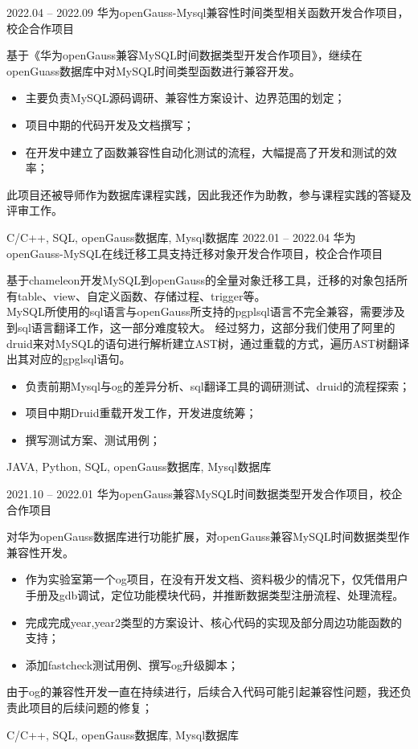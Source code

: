 \begin{experiences}
\emptySeparator	
 \experiencenew
    {2022.04 -- 2022.09} {华为openGauss-Mysql兼容性时间类型相关函数开发合作项目，校企合作项目}
    {
      基于《华为openGauss兼容MySQL时间数据类型开发合作项目》，继续在openGuass数据库中对MySQL时间类型函数进行兼容开发。
      \begin{itemize}
        \item  主要负责MySQL源码调研、兼容性方案设计、边界范围的划定；
        \item  项目中期的代码开发及文档撰写；
        \item  在开发中建立了函数兼容性自动化测试的流程，大幅提高了开发和测试的效率；
      \end{itemize}
      此项目还被导师作为数据库课程实践，因此我还作为助教，参与课程实践的答疑及评审工作。
                  }
                  {C/C++, SQL, openGauss数据库, Mysql数据库}
  \emptySeparator
  \experiencenew
    {2022.01 -- 2022.04} {华为openGauss-MySQL在线迁移工具支持迁移对象开发合作项目，校企合作项目}
    {
      基于chameleon开发MySQL到openGauss的全量对象迁移工具，迁移的对象包括所有table、view、自定义函数、存储过程、trigger等。 \\
      MySQL所使用的sql语言与openGauss所支持的pgplsql语言不完全兼容，需要涉及到sql语言翻译工作，这一部分难度较大。
      经过努力，这部分我们使用了阿里的druid来对MySQL的语句进行解析建立AST树，通过重载的方式，遍历AST树翻译出其对应的gpglsql语句。
      \begin{itemize}
        \item  负责前期Mysql与og的差异分析、sql翻译工具的调研测试、druid的流程探索；
        \item  项目中期Druid重载开发工作，开发进度统筹；
        \item  撰写测试方案、测试用例；
      \end{itemize}
                }
                {JAVA, Python, SQL, openGauss数据库, Mysql数据库}
	
  \emptySeparator
  \experiencenew
  {2021.10 -- 2022.01} {华为openGauss兼容MySQL时间数据类型开发合作项目，校企合作项目}
  {
    对华为openGauss数据库进行功能扩展，对openGauss兼容MySQL时间数据类型作兼容性开发。
    \begin{itemize}
      \item  作为实验室第一个og项目，在没有开发文档、资料极少的情况下，仅凭借用户手册及gdb调试，定位功能模块代码，并推断数据类型注册流程、处理流程。
      \item  完成完成year,year2类型的方案设计、核心代码的实现及部分周边功能函数的支持；
      \item  添加fastcheck测试用例、撰写og升级脚本；
    \end{itemize}
    由于og的兼容性开发一直在持续进行，后续合入代码可能引起兼容性问题，我还负责此项目的后续问题的修复；
              }
              {C/C++, SQL, openGauss数据库, Mysql数据库}


\end{experiences}
